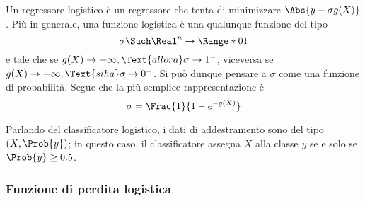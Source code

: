 \documentclass{subfiles}
\begin{document}
Un regressore logistico è un regressore che tenta di minimizzare \(\Abs{y - \sigma g(X)}\).
Più in generale, una funzione logistica è una qualunque funzione del tipo
\[
    \sigma \Such \Real^{n} \to \Range*{0}{1}
\]
e tale che se \(g(X) \to + \infty, \Text{allora} \sigma \to 1^{-}\), viceversa se \(g(X) \to - \infty, \Text{si ha} \sigma \to 0^{+}\).
Si può dunque pensare a \(\sigma\) come una funzione di probabilità.
Segue che la più semplice rappresentazione è
\[
    \sigma = \Frac{1}{1 - e^{-g(X)}}
\]

Parlando del classificatore logistico, i dati di addestramento sono del tipo \((X, \Prob{y})\);
in questo caso, il classificatore assegna \(X\) alla classe \(y\) se e solo se \(\Prob{y} \ge 0.5\).

\subsubsection{Funzione di perdita logistica}

\end{document}
